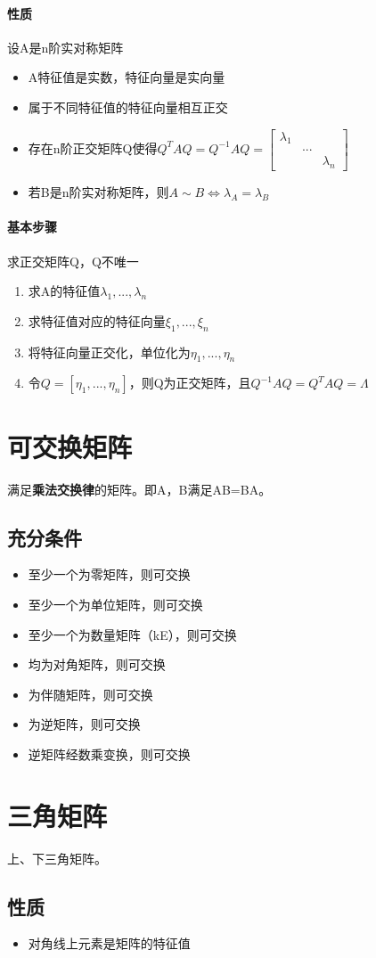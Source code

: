 \paragraph{性质}
设A是n阶实对称矩阵
\begin{itemize}
    \item A特征值是实数，特征向量是实向量
    \item 属于不同特征值的特征向量相互正交
    \item 存在n阶正交矩阵Q使得\(Q^TAQ = Q^{-1}AQ = \begin{bmatrix}
        \lambda_1 & & \\ 
        & ... & \\ 
        & & \lambda_n
    \end{bmatrix}\)
    \item 若B是n阶实对称矩阵，则\(A \sim B \Leftrightarrow \lambda_A = \lambda_B\)
\end{itemize}

\paragraph{基本步骤}
求正交矩阵Q，Q不唯一
\begin{enumerate}
    \item 求A的特征值\(\lambda_1, ..., \lambda_n\)
    \item 求特征值对应的特征向量\(\xi_1, ..., \xi_n\)
    \item 将特征向量正交化，单位化为\(\eta_1, ..., \eta_n\)
    \item 令\(Q = [\eta_1, ..., \eta_n]\)，则Q为正交矩阵，且\(Q^{-1}AQ = Q^TAQ = \Lambda\)
\end{enumerate}


\section{可交换矩阵}
满足\textbf{乘法交换律}的矩阵。即A，B满足AB=BA。

\subsection{充分条件}
\begin{itemize}
    \item 至少一个为零矩阵，则可交换
    \item 至少一个为单位矩阵，则可交换
    \item 至少一个为数量矩阵（kE），则可交换
    \item 均为对角矩阵，则可交换
    \item 为伴随矩阵，则可交换
    \item 为逆矩阵，则可交换
    \item 逆矩阵经数乘变换，则可交换
\end{itemize}


\section{三角矩阵}
上、下三角矩阵。

\subsection{性质}
\begin{itemize}
    \item 对角线上元素是矩阵的特征值
\end{itemize}





